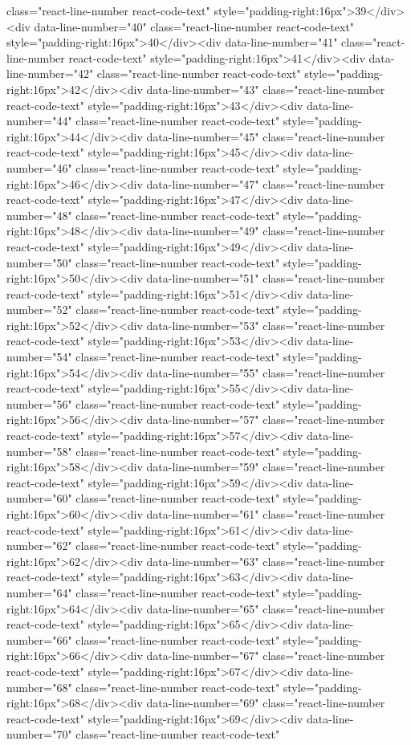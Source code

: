 {{{{{{{{{{{{{{{{{{{{{{{{{{{{{{{class="react-line-number react-code-text" style="padding-right:16px">39</div><div data-line-number="40" class="react-line-number react-code-text" style="padding-right:16px">40</div><div data-line-number="41" class="react-line-number react-code-text" style="padding-right:16px">41</div><div data-line-number="42" class="react-line-number react-code-text" style="padding-right:16px">42</div><div data-line-number="43" class="react-line-number react-code-text" style="padding-right:16px">43</div><div data-line-number="44" class="react-line-number react-code-text" style="padding-right:16px">44</div><div data-line-number="45" class="react-line-number react-code-text" style="padding-right:16px">45</div><div data-line-number="46" class="react-line-number react-code-text" style="padding-right:16px">46</div><div data-line-number="47" class="react-line-number react-code-text" style="padding-right:16px">47</div><div data-line-number="48" class="react-line-number react-code-text" style="padding-right:16px">48</div><div data-line-number="49" class="react-line-number react-code-text" style="padding-right:16px">49</div><div data-line-number="50" class="react-line-number react-code-text" style="padding-right:16px">50</div><div data-line-number="51" class="react-line-number react-code-text" style="padding-right:16px">51</div><div data-line-number="52" class="react-line-number react-code-text" style="padding-right:16px">52</div><div data-line-number="53" class="react-line-number react-code-text" style="padding-right:16px">53</div><div data-line-number="54" class="react-line-number react-code-text" style="padding-right:16px">54</div><div data-line-number="55" class="react-line-number react-code-text" style="padding-right:16px">55</div><div data-line-number="56" class="react-line-number react-code-text" style="padding-right:16px">56</div><div data-line-number="57" class="react-line-number react-code-text" style="padding-right:16px">57</div><div data-line-number="58" class="react-line-number react-code-text" style="padding-right:16px">58</div><div data-line-number="59" class="react-line-number react-code-text" style="padding-right:16px">59</div><div data-line-number="60" class="react-line-number react-code-text" style="padding-right:16px">60</div><div data-line-number="61" class="react-line-number react-code-text" style="padding-right:16px">61</div><div data-line-number="62" class="react-line-number react-code-text" style="padding-right:16px">62</div><div data-line-number="63" class="react-line-number react-code-text" style="padding-right:16px">63</div><div data-line-number="64" class="react-line-number react-code-text" style="padding-right:16px">64</div><div data-line-number="65" class="react-line-number react-code-text" style="padding-right:16px">65</div><div data-line-number="66" class="react-line-number react-code-text" style="padding-right:16px">66</div><div data-line-number="67" class="react-line-number react-code-text" style="padding-right:16px">67</div><div data-line-number="68" class="react-line-number react-code-text" style="padding-right:16px">68</div><div data-line-number="69" class="react-line-number react-code-text" style="padding-right:16px">69</div><div data-line-number="70" class="react-line-number react-code-text" }}}}}}}}}}}}}}}}}}}}}}}}}}}}}}}
